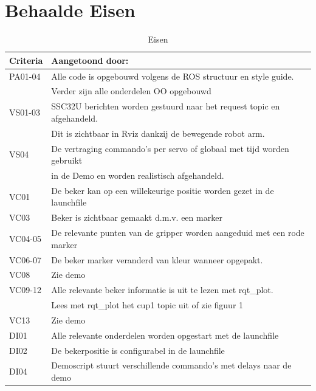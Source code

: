 \documentclass[11pt,titlepage]{article}
\begin{document}
\section{Behaalde Eisen}
\begin{table}[H]
\centering
\begin{tabular}[H]{|l|l|}
\hline
\rowcolor[HTML]{C0C0C0}
Criteria        &   Aangetoond door:                                                        \\ \hline
PA01-04         &   Alle code is opgebouwd volgens de ROS structuur en style guide.         \\ 
                &   Verder zijn alle onderdelen OO opgebouwd                                \\ \hline
VS01-03         &   SSC32U berichten worden gestuurd naar het request topic en afgehandeld. \\   
                &   Dit is zichtbaar in Rviz dankzij de bewegende robot arm.                \\ \hline
VS04            &   De vertraging commando's per servo of globaal met tijd worden gebruikt  \\ 
                &   in de Demo en worden realistisch afgehandeld.                           \\ \hline
VC01            &   De beker kan op een willekeurige positie worden gezet in de launchfile  \\ \hline
VC03            &   Beker is zichtbaar gemaakt d.m.v. een marker                            \\ \hline
VC04-05         &   De relevante punten van de gripper worden aangeduid met een rode marker \\ \hline
VC06-07         &   De beker marker veranderd van kleur wanneer opgepakt.                   \\ \hline
VC08            &   Zie demo                                                                \\ \hline
VC09-12         &   Alle relevante beker informatie is uit te lezen met rqt\_plot.           \\ 
                &   Lees met rqt\_plot het cup1 topic uit of zie figuur 1                    \\ \hline
VC13            &   Zie demo                                                                \\ \hline
DI01            &   Alle relevante onderdelen worden opgestart met de launchfile            \\ \hline
DI02            &   De bekerpositie is configurabel in de launchfile                        \\ \hline
DI04            &   Demoscript stuurt verschillende commando's met delays naar de demo      \\ \hline

\end{tabular}
\caption{Eisen}
\end{table}
\end{document}
